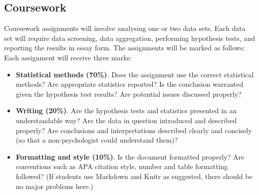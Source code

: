 \documentclass[a4paper,12pt]{article}
\begin{document}
\subsection{Coursework} Coursework assignments will involve analysing one or two data sets. Each data set will require data screening, data aggregation, performing hypothesis tests, and reporting the results in essay form. The assignments will be marked as follows: Each assignment will receive three marks:
	\begin{itemize}
			\item{\textbf{Statistical methods (70\%)}. Does the assignment use the correct statistical methods? Are appropriate statistics reported? Is the conclusion warranted given the hypothesis test results? Are potential issues discussed properly?}
			\item{\textbf{Writing (20\%)}. Are the hypothesis tests and statistics presented in an understandable way? Are the data in question introduced and described properly? Are conclusions and interpretations described clearly and concisely (so that a non-psychologist could understand them)?}
			\item{\textbf{Formatting and style (10\%)}. Is the document formatted properly? Are conventions such as APA citation style, number and table formatting followed? (If students use Markdown and Knitr as suggested, there should be no major problems here.)}
	\end{itemize}
\end{document}
